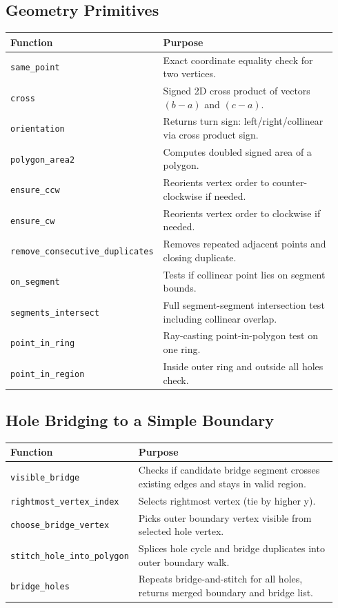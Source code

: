\documentclass[11pt]{article}
\begin{document}
\subsection{Geometry Primitives}
\begin{longtable}{p{0.28\linewidth}p{0.66\linewidth}}
\toprule
Function & Purpose \\
\midrule
\texttt{same\_point} & Exact coordinate equality check for two vertices. \\
\texttt{cross} & Signed 2D cross product of vectors $(b-a)$ and $(c-a)$. \\
\texttt{orientation} & Returns turn sign: left/right/collinear via cross product sign. \\
\texttt{polygon\_area2} & Computes doubled signed area of a polygon. \\
\texttt{ensure\_ccw} & Reorients vertex order to counter-clockwise if needed. \\
\texttt{ensure\_cw} & Reorients vertex order to clockwise if needed. \\
\texttt{remove\_consecutive\_duplicates} & Removes repeated adjacent points and closing duplicate. \\
\texttt{on\_segment} & Tests if collinear point lies on segment bounds. \\
\texttt{segments\_intersect} & Full segment-segment intersection test including collinear overlap. \\
\texttt{point\_in\_ring} & Ray-casting point-in-polygon test on one ring. \\
\texttt{point\_in\_region} & Inside outer ring and outside all holes check. \\
\bottomrule
\end{longtable}

\subsection{Hole Bridging to a Simple Boundary}
\begin{longtable}{p{0.28\linewidth}p{0.66\linewidth}}
\toprule
Function & Purpose \\
\midrule
\texttt{visible\_bridge} & Checks if candidate bridge segment crosses existing edges and stays in valid region. \\
\texttt{rightmost\_vertex\_index} & Selects rightmost vertex (tie by higher y). \\
\texttt{choose\_bridge\_vertex} & Picks outer boundary vertex visible from selected hole vertex. \\
\texttt{stitch\_hole\_into\_polygon} & Splices hole cycle and bridge duplicates into outer boundary walk. \\
\texttt{bridge\_holes} & Repeats bridge-and-stitch for all holes, returns merged boundary and bridge list. \\
\bottomrule
\end{longtable}
\end{document}
